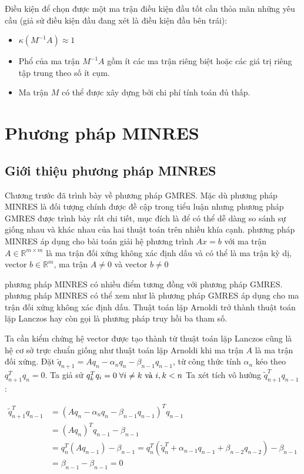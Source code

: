\documentclass[14pt, a4paper]{article}
\numberwithin{equation}{section}
\numberwithin{algorithm}{section}
\numberwithin{figure}{section}
\numberwithin{dl}{section}
\numberwithin{md}{section}
\numberwithin{bd}{section}
\numberwithin{dn}{section}
\begin{document}
Điều kiện để chọn được một ma trận điều kiện đầu tốt cần thỏa mãn những yêu cầu (giả sử điều kiện đầu đang xét là điều kiện đầu bên trái):

\begin{itemize}
    \item $\kappa(M^{-1}A)\approx 1$
    \item Phổ của ma trận $M^{-1}A$ gồm ít các ma trận riêng biệt hoặc các giá trị riêng tập trung theo số ít cụm.
    \item Ma trận $M$ có thể được xây dựng bởi chi phí tính toán đủ thấp.
\end{itemize}

\section{Phương pháp MINRES}

\subsection{Giới thiệu phương pháp MINRES}

Chương trước đã trình bày về phương pháp GMRES. Mặc dù phương pháp MINRES là đối tượng chính được đề cập trong tiểu luận nhưng phương pháp GMRES được trình bày rất chi tiết, mục đích là để có thể dễ dàng so sánh sự giống nhau và khác nhau của hai thuật toán trên nhiều khía cạnh. phương pháp MINRES áp dụng cho bài toán giải hệ phương trình $Ax=b$ với ma trận $A \in \mathbb{R}^{m \times m}$ là ma trận đối xứng không xác định dấu và có thể là ma trận kỳ dị, vector $b \in \mathbb{R}^m$, ma trận $A \neq 0$ và vector $b \neq 0$

phương pháp MINRES có nhiều điểm tương đồng với phương pháp GMRES. phương pháp MINRES có thể xem như là phương pháp GMRES áp dụng cho ma trận đối xứng không xác định dấu.
Thuật toán lặp Arnoldi trở thành thuật toán lặp Lanczos hay còn gọi là phương pháp truy hồi ba tham số.

Ta cần kiểm chứng hệ vector được tạo thành từ thuật toán lặp Lanczos cũng là hệ cơ sở trực chuẩn giống như thuật toán lặp Arnoldi khi ma trận $A$ là ma trận đối xứng. Đặt $\tilde{q}_{n+1}=Aq_{n} - \alpha_n q_n - \beta_{n-1}q_{n-1}$,
từ công thức tính $\alpha_n$ kéo theo $q_{n+1}^T q_n=0$. Ta giả sử $q_k^T q_i =0 \thickspace \forall i \neq k \text{ và } i, k < n$
Ta xét tích vô hướng $\tilde{q}_{n+1}^T q_{n-1}$:

\begin{equation}
    \begin{aligned}
        \tilde{q}_{n+1}^T q_{n-1}&=(Aq_{n} - \alpha_n q_n - \beta_{n-1}q_{n-1})^T q_{n-1} \\
        & = (Aq_{n})^T q_{n-1} - \beta_{n-1}\\
        & =q_{n}^T (Aq_{n-1}) - \beta_{n-1}=q_n^T(\tilde{q}_n^T + \alpha_{n-1}q_{n-1} + \beta_{n-2}q_{n-2})-\beta_{n-1} \\
        &= \beta_{n-1} - \beta_{n-1} = 0
    \end{aligned}
\end{equation}
\end{document}
